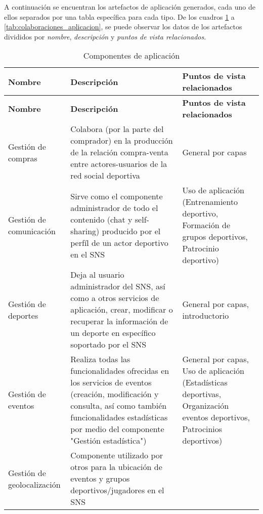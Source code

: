 A continuación se encuentran los artefactos de aplicación generados, cada uno de ellos separados por una tabla específica para cada tipo. De los cuadros \ref{tab:componentes_aplicacion} a \ref{tab:colaboraciones_aplicacion}, se puede observar los datos de los artefactos divididos por \textit{nombre}, \textit{descripción} y \textit{puntos de vista relacionados}.%

\begin{center}
	\begin{longtable}{|p{4cm}|p{7cm}|p{4cm}|}
		\caption{Componentes de aplicación \label{tab:componentes_aplicacion}} \\
		\hline
		\textbf{Nombre} &
		\textbf{Descripción} &
		\textbf{Puntos de vista relacionados} \\
		\hline
		\endfirsthead
		\hline
		\textbf{Nombre} &
		\textbf{Descripción} &
		\textbf{Puntos de vista relacionados} \\
		\hline
		\endhead
		\hline
		\endfoot
		\hline
		\endlastfoot
		Gestión de compras & 
			Colabora (por la parte del comprador) en la producción de la relación compra-venta entre actores-usuarios de la red social deportiva & 
			General por capas
			\\
			\hline
			Gestión de comunicación & 
			Sirve como el componente administrador de todo el contenido (chat y self-sharing) producido por el perfíl de un actor deportivo en el SNS & 
			Uso de aplicación (Entrenamiento deportivo, Formación de grupos deportivos, Patrocinio deportivo)
			\\
			\hline
			Gestión de deportes & 
			Deja al usuario administrador del SNS, así como a otros servicios de aplicación, crear, modificar o recuperar la información de un deporte en específico soportado por el SNS & 
			General por capas, introductorio
			\\
			\hline
			Gestión de eventos & 
			Realiza todas las funcionalidades ofrecidas en los servicios de eventos (creación, modificación y consulta, así como también funcionalidades estadísticas por medio del componente "Gestión estadística") & 
			General por capas, Uso de aplicación (Estadísticas deportivas, Organización eventos deportivos, Patrocinios deportivos)
			\\
			\hline
			Gestión de geolocalización & 
			Componente utilizado por otros para la ubicación de eventos y grupos deportivos/jugadores en el SNS & 

\end{longtable}
\end{center}
